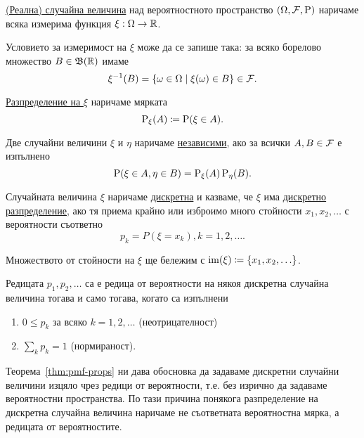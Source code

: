 \documentclass[numbers=endperiod, DIV=15, bibliography=totocnumbered]{scrartcl}
\begin{document}
\begin{definition}
  \uline{(Реална) случайна величина} над вероятностното пространство $(\Omega, \mathcal{F}, \operatorname{P})$ наричаме всяка измерима функция $\xi : \Omega \to \mathbb{R}$.

  Условието за измеримост на $\xi$ може да се запише така: за всяко борелово множество $B \in \mathfrak{B}(\mathbb{R})$ имаме
  \begin{displaymath}
    \xi^{-1} (B) = \{ \omega \in \Omega \mid \xi(\omega) \in B \} \in \mathcal{F}.
  \end{displaymath}

  \uline{Разпределение на $\xi$} наричаме мярката
  \begin{displaymath}
    \operatorname{P}_\xi(A) \coloneqq \operatorname{P}(\xi \in A).
  \end{displaymath}

  Две случайни величини $\xi$ и $\eta$ наричаме \uline{независими}, ако за всички $A, B \in \mathcal{F}$ е изпълнено
  \begin{displaymath}
    \operatorname{P}(\xi \in A, \eta \in B) = \operatorname{P}_\xi(A) \operatorname{P}_\eta(B).
  \end{displaymath}

  Случайната величина $\xi$ наричаме \uline{дискретна} и казваме, че $\xi$ има \uline{дискретно разпределение}, ако тя приема крайно или изброимо много стойности $x_1, x_2, \ldots$ с вероятности съответно
  \begin{displaymath}
    p_k = P(\xi = x_k), k = 1, 2, \ldots.
  \end{displaymath}

  Множеството от стойности на $\xi$ ще бележим с $\operatorname{im}(\xi) \coloneqq \{ x_1, x_2, \ldots \}$.
\end{definition}

\begin{theorem}\label{thm:pmf-props}
  Редицата $p_1, p_2, \ldots$ са е редица от вероятности на някоя дискретна случайна величина тогава и само тогава, когато са изпълнени
  \begin{enumerate}
    \item\label{thm:pmf-props.bounded} $0 \leq p_k$ за всяко $k = 1, 2, \ldots$ (неотрицателност)
    \item\label{thm:pmf-props.normed} $\sum_k p_k = 1$ (нормираност).
  \end{enumerate}
\end{theorem}

Теорема~\ref{thm:pmf-props} ни дава обосновка да задаваме дискретни случайни величини изцяло чрез редици от вероятности, т.е. без изрично да задаваме вероятностни пространства. По тази причина понякога разпределение на дискретна случайна величина наричаме не съответната вероятностна мярка, а редицата от вероятностите.
\end{document}
